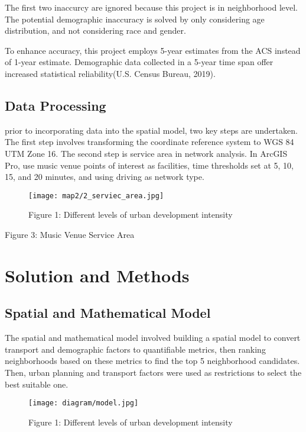 \documentclass[11pt]{article}
\begin{document}
The first two inaccurcy are ignored because this project is in neighborhood level. The potential demographic inaccuracy is solved by only considering age distribution, and not considering race and gender.

To enhance accuracy, this project employs 5-year estimates from the ACS instead of 1-year estimate. Demographic data collected in a 5-year time span offer increased statistical reliability(U.S. Census Bureau, 2019).


\subsection{Data Processing}
prior to incorporating data into the spatial model, two key steps are undertaken. The first step involves transforming the coordinate reference system to WGS 84 UTM Zone 16. The second step is service area in network analysis. In ArcGIS Pro, use music venue points of interest as facilities, time thresholds set at 5, 10, 15, and 20 minutes, and using driving as network type.

\begin{figure}[H]
\begin{center}
\centering
\texttt{[image: map2/2\_serviec\_area.jpg]}
\caption{Figure 1: Different levels of urban development intensity}
\label{fig:figure1}
\end{center}
\end{figure}

\begin{center}
\centering
Figure 3: Music Venue Service Area
\end{center}





\section{Solution and Methods}
\subsection{Spatial and Mathematical Model}
The spatial and mathematical model involved building a spatial model to convert transport and demographic factors to quantifiable metrics, then ranking neighborhoods based on these metrics to find the top 5 neighborhood candidates. Then, urban planning and transport factors were used as restrictions to select the best suitable one.


\begin{figure}[H]
\begin{center}
\centering
\texttt{[image: diagram/model.jpg]}
\caption{Figure 1: Different levels of urban development intensity}
\label{fig:figure1}
\end{center}
\end{figure}
\end{document}

